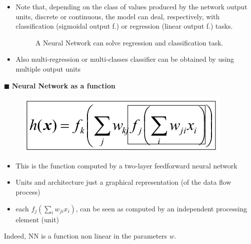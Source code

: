 \documentclass[../main.tex]{subfiles}
\begin{document}
\begin{itemize}
    \item Note that, depending on the class of values produced by the network output units, discrete or continuous, the model can deal, respectively, with classification (sigmoidal output f.) or regression (linear output f.) tasks.
    \begin{figure}[H]
      \centering
      \hfill
      \caption{A Neural Network can solve regression and classification task.}
    \end{figure}
    \item Also multi-regression or multi-classes classifier can be obtained by using multiple output units
\end{itemize}

\noindent$\blacksquare$ \textbf{Neural Network as a function}\\
\begin{figure}[H]
    \centering
    \includegraphics[scale = 0.4]{lectures/4_neural_networks/4_nn_as_function.png}
\end{figure}
\begin{itemize}
    \item This is the function computed by a two-layer feedforward neural network
    \item Units and architecture just a graphical representation (of the data flow process)
    \item each $f_j(\sum_{i}^{}w_{ji}x_i)$, can be seen as computed by an independent processing
element (unit)
\end{itemize}
Indeed, NN is a function non linear in the parameters $w$.\\
\end{document}
